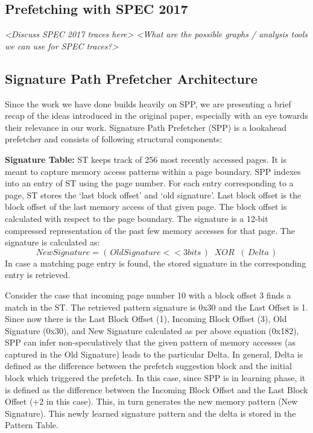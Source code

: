  
\subsection{Prefetching with SPEC 2017}
\textit{<Discuss SPEC 2017 traces here>
<What are the possible graphs / analysis tools we can use for SPEC traces?>}

\subsection{Signature Path Prefetcher Architecture}
Since the work we have done builds heavily on SPP\cite{SPP}, we are
presenting a brief recap of the ideas introduced in the original
paper, especially with an eye towards their relevance in our work.
Signature Path Prefetcher (SPP) is a lookahead prefetcher and consists
of following structural components:

\textbf{Signature Table:} ST keeps track of 256 most recently accessed
pages.  It is meant to capture memory access patterns within a page
boundary.  SPP indexes into an entry of ST using the page number.  For
each entry corresponding to a page, ST stores the `last block offset'
and `old signature'.  Last block offset is the block offset of the
last memory access of that given page.  The block offset is calculated
with respect to the page boundary.  The signature is a 12-bit
compressed representation of the past few memory accesses for that
page.  The signature is calculated as:
$$New Signature = (\,Old Signature << 3 bits\,) \;\;XOR\;\; (\,Delta\,)$$ 
In case a matching page entry is found, the stored signature in the corresponding entry is retrieved.

Consider the case that incoming page number 10 with a block offset 3
finds a match in the ST.  The retrieved pattern signature is 0x30 and
the Last Offset is 1.  Since now there is the Last Block Offset (1),
Incoming Block Offset (3), Old Signature (0x30), and New Signature
calculated as per above equation (0x182), SPP can infer
non-speculatively that the given pattern of memory accesses (as
captured in the Old Signature) leads to the particular Delta.  In
general, Delta is defined as the difference between the prefetch
suggestion block and the initial block which triggered the prefetch.
In this case, since SPP is in learning phase, it is defined as the
difference between the Incoming Block Offset and the Last Block Offset
(+2 in this case).  This, in turn generates the new memory pattern
(New Signature).  This newly learned signature pattern and the delta
is stored in the Pattern Table.

